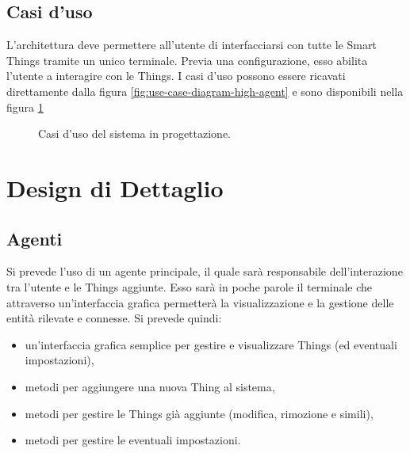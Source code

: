 \documentclass[12pt,a4paper,openright,oneside]{report}
\begin{document}
\subsection{Casi d'uso}
L'architettura deve permettere all'utente di interfacciarsi con tutte le Smart Things tramite un unico terminale. Previa una configurazione, esso abilita l'utente a interagire con le Things. I casi d'uso possono essere ricavati direttamente dalla figura \ref{fig:use-case-diagram-high-agent} e sono disponibili nella figura \ref{fig:use-case}

\begin{figure}[h]
	\centering
	\caption{Casi d'uso del sistema in progettazione.}
	\label{fig:use-case}
\end{figure}


\clearpage
\section{Design di Dettaglio}

\subsection{Agenti}
Si prevede l'uso di un agente principale, il quale sarà responsabile dell'interazione tra l'utente e le Things aggiunte. Esso sarà in poche parole il terminale che attraverso un'interfaccia grafica permetterà la visualizzazione e la gestione delle entità rilevate e connesse. Si prevede quindi:
\begin{itemize}
	\item un'interfaccia grafica semplice per gestire e visualizzare Things (ed eventuali impostazioni),
	\item metodi per aggiungere una nuova Thing al sistema,
	\item metodi per gestire le Things già aggiunte (modifica, rimozione e simili),
	\item metodi per gestire le eventuali impostazioni.
\end{itemize}
\end{document}
